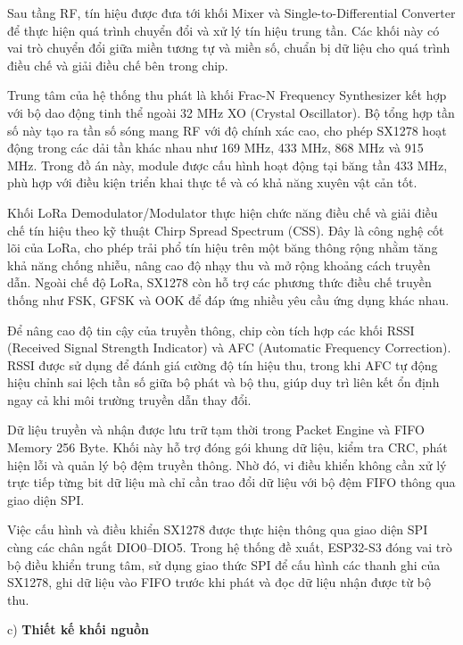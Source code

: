 Sau tầng RF, tín hiệu được đưa tới khối Mixer và Single-to-Differential Converter để thực hiện quá trình chuyển đổi và xử lý tín hiệu trung tần. Các khối này có vai trò chuyển đổi giữa miền tương tự và miền số, chuẩn bị dữ liệu cho quá trình điều chế và giải điều chế bên trong chip.

Trung tâm của hệ thống thu phát là khối Frac-N Frequency Synthesizer kết hợp với bộ dao động tinh thể ngoài 32 MHz XO (Crystal Oscillator). Bộ tổng hợp tần số này tạo ra tần số sóng mang RF với độ chính xác cao, cho phép SX1278 hoạt động trong các dải tần khác nhau như 169 MHz, 433 MHz, 868 MHz và 915 MHz. Trong đồ án này, module được cấu hình hoạt động tại băng tần 433 MHz, phù hợp với điều kiện triển khai thực tế và có khả năng xuyên vật cản tốt.

Khối LoRa Demodulator/Modulator thực hiện chức năng điều chế và giải điều chế tín hiệu theo kỹ thuật Chirp Spread Spectrum (CSS). Đây là công nghệ cốt lõi của LoRa, cho phép trải phổ tín hiệu trên một băng thông rộng nhằm tăng khả năng chống nhiễu, nâng cao độ nhạy thu và mở rộng khoảng cách truyền dẫn. Ngoài chế độ LoRa, SX1278 còn hỗ trợ các phương thức điều chế truyền thống như FSK, GFSK và OOK để đáp ứng nhiều yêu cầu ứng dụng khác nhau.

Để nâng cao độ tin cậy của truyền thông, chip còn tích hợp các khối RSSI (Received Signal Strength Indicator) và AFC (Automatic Frequency Correction). RSSI được sử dụng để đánh giá cường độ tín hiệu thu, trong khi AFC tự động hiệu chỉnh sai lệch tần số giữa bộ phát và bộ thu, giúp duy trì liên kết ổn định ngay cả khi môi trường truyền dẫn thay đổi.

Dữ liệu truyền và nhận được lưu trữ tạm thời trong Packet Engine và FIFO Memory 256 Byte. Khối này hỗ trợ đóng gói khung dữ liệu, kiểm tra CRC, phát hiện lỗi và quản lý bộ đệm truyền thông. Nhờ đó, vi điều khiển không cần xử lý trực tiếp từng bit dữ liệu mà chỉ cần trao đổi dữ liệu với bộ đệm FIFO thông qua giao diện SPI.

Việc cấu hình và điều khiển SX1278 được thực hiện thông qua giao diện SPI cùng các chân ngắt DIO0–DIO5. Trong hệ thống đề xuất, ESP32-S3 đóng vai trò bộ điều khiển trung tâm, sử dụng giao thức SPI để cấu hình các thanh ghi của SX1278, ghi dữ liệu vào FIFO trước khi phát và đọc dữ liệu nhận được từ bộ thu.

c) \textbf{Thiết kế khối nguồn}

